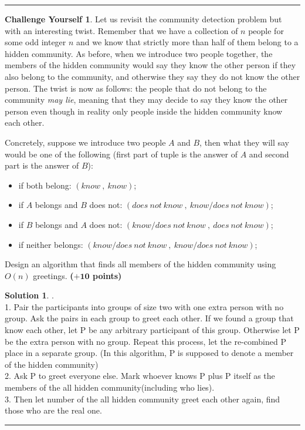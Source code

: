 \documentclass{article}
\theoremstyle{definition}
\newtheorem*{challenge}{Challenge Yourself}
\def\fline{\rule{0.75\linewidth}{0.5pt}}
\newcommand{\finishline}{\begin{center}\fline\end{center}}
\newtheorem*{solution*}{Solution}
\newenvironment{solution}{\begin{solution*}}{{\finishline} \end{solution*}}
\newcommand{\grade}[1]{\hfill{\textbf{($\mathbf{#1}$ points)}}}
\begin{document}

\smallskip

\finishline

\begin{challenge}
	Let us revisit the community detection problem but with an interesting twist. Remember that we have a collection of $n$ people for some odd integer $n$ and we know that strictly more than half of them belong to a hidden community. 
	As before, when we introduce two people together, the members of the hidden community would say they know the other person if they also belong to the community, and otherwise they say they do not know the other person. 
	The twist is now as follows: the people that do not belong to the community \emph{may lie}, meaning that they may decide to say they know the other person even though in reality only people inside the hidden community know each other.
	
	Concretely, 
	suppose we introduce two people $A$ and $B$, then what they will say would be one of the following (first part of tuple is the answer of $A$ and second part is the answer of $B$): 
	\begin{itemize}
		\item if both belong: $(know~,~know)$;
		\item if $A$ belongs  and $B$ does not: $(does\ not\ know~,~know/does\ not\ know)$; 
		\item if $B$ belongs  and $A$ does not: $(know/does\ not\ know~,~does\ not\ know)$; 
		\item if neither belongs:  $(know/does\ not\ know~,~know/does\ not\ know)$; 
	\end{itemize}
	Design an algorithm that finds all members of the hidden community using $O(n)$ greetings. \grade{+10} 
	
	\begin{solution} .\\
		1. Pair the participants into groups of size two with one extra person with no group. Ask the pairs in each group to greet each other. If we found a group that know each other, let P be any arbitrary participant of this group. 			Otherwise let P be the extra person with no group. Repeat this process, let the re-combined P place in a separate group. (In this algorithm, P is supposed to denote a member of the hidden community) \\
		2. Ask P to greet everyone else. Mark whoever knows P plus P itself as the members of the all hidden community(including who lies). \\
		3. Then let number of the all hidden community greet each other again, find those who are the real one. 
	
	\end{solution} 
	
\end{challenge}
\end{document}
